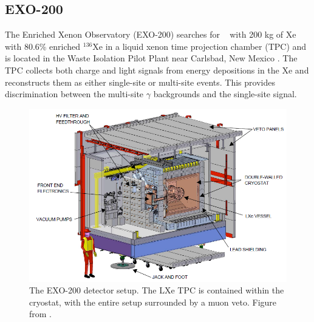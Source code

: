 \subsection{EXO-200}
The Enriched Xenon Observatory (EXO-200) searches for \zeronubb~ with 200 kg of Xe with 80.6\% enriched $^{136}$Xe in a liquid xenon time projection chamber (TPC) and is located in the Waste Isolation Pilot Plant near Carlsbad, New Mexico \cite{Albert:2017owj}.
The TPC collects both charge and light signals from energy depositions in the Xe and reconstructs them as either single-site or multi-site events.
This provides discrimination between the multi-site $\gamma$ backgrounds and the single-site signal.
\begin{figure}[htbp]
    \centering
    \includegraphics[width=0.7\linewidth]{Figures/EXO.png}
    \caption[The EXO-200 detector setup.]
    {The EXO-200 detector setup.
    The LXe TPC is contained within the cryostat, with the entire setup surrounded by a muon veto.
    Figure from \cite{Auger:2012gs}.}
    \label{fig:EXO}
\end{figure}

